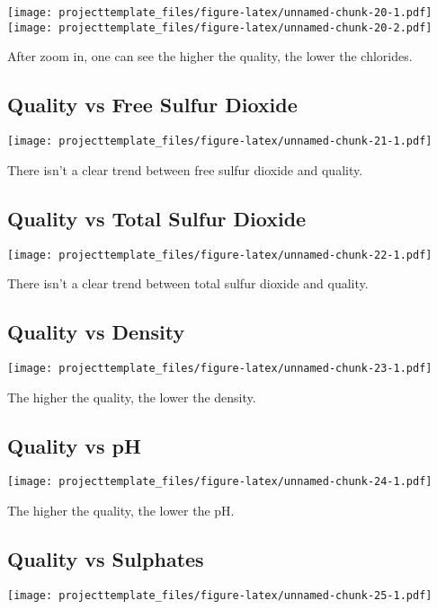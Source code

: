 \documentclass[]{article}
\begin{document}
\texttt{[image: projecttemplate\_files/figure-latex/unnamed-chunk-20-1.pdf]}
\texttt{[image: projecttemplate\_files/figure-latex/unnamed-chunk-20-2.pdf]}

After zoom in, one can see the higher the quality, the lower the
chlorides.

\subsection{Quality vs Free Sulfur
Dioxide}\label{quality-vs-free-sulfur-dioxide}

\texttt{[image: projecttemplate\_files/figure-latex/unnamed-chunk-21-1.pdf]}

There isn't a clear trend between free sulfur dioxide and quality.

\subsection{Quality vs Total Sulfur
Dioxide}\label{quality-vs-total-sulfur-dioxide}

\texttt{[image: projecttemplate\_files/figure-latex/unnamed-chunk-22-1.pdf]}

There isn't a clear trend between total sulfur dioxide and quality.

\subsection{Quality vs Density}\label{quality-vs-density}

\texttt{[image: projecttemplate\_files/figure-latex/unnamed-chunk-23-1.pdf]}

The higher the quality, the lower the density.

\subsection{Quality vs pH}\label{quality-vs-ph}

\texttt{[image: projecttemplate\_files/figure-latex/unnamed-chunk-24-1.pdf]}

The higher the quality, the lower the pH.

\subsection{Quality vs Sulphates}\label{quality-vs-sulphates}

\texttt{[image: projecttemplate\_files/figure-latex/unnamed-chunk-25-1.pdf]}
\end{document}
